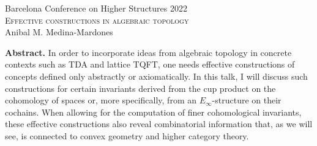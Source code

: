 \documentclass{article}
\begin{document}
	\pagestyle{empty}
	\begin{center}
		\large Barcelona Conference on Higher Structures 2022 \\
		\vspace*{5pt}
		\Large\textsc{Effective constructions in algebraic topology} \\
		\vspace*{10pt}
		\normalsize Anibal M. Medina-Mardones
	\end{center}
	\textbf{Abstract.} In order to incorporate ideas from algebraic topology in concrete contexts such as TDA and lattice TQFT, one needs effective constructions of concepts defined only abstractly or axiomatically.
	In this talk, I will discuss such constructions for certain invariants derived from the cup product on the cohomology of spaces or, more specifically, from an $E_\infty$-structure on their cochains.
	When allowing for the computation of finer cohomological invariants, these effective constructions also reveal combinatorial information that, as we will see, is connected to convex geometry and higher category theory.
\end{document}
